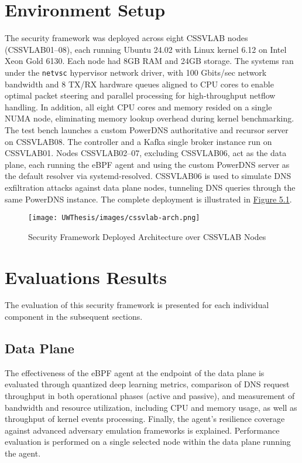 \documentclass [11pt, proquest] {uwthesis}[2020/02/24]
\begin{document}
\section{Environment Setup}
The security framework was deployed across eight CSSVLAB nodes (CSSVLAB{01–08}), each running Ubuntu 24.02 with Linux kernel 6.12 on Intel Xeon Gold 6130. Each node had 8GB RAM and 24GB storage. The systems ran under the \texttt{netvsc} hypervisor network driver, with 100 Gbits/sec network bandwidth and 8 TX/RX hardware queues aligned to CPU cores to enable optimal packet steering and parallel processing for high-throughput netflow handling. In addition, all eight CPU cores and memory resided on a single NUMA node, eliminating memory lookup overhead during kernel benchmarking. The test bench launches a custom PowerDNS authoritative and recursor server on CSSVLAB08. The controller and a Kafka single broker instance run on CSSVLAB01. Nodes CSSVLAB{02–07}, excluding CSSVLAB06, act as the data plane, each running the eBPF agent and using the custom PowerDNS server as the default resolver via systemd-resolved. CSSVLAB06 is used to simulate DNS exfiltration attacks against data plane nodes, tunneling DNS queries through the same PowerDNS instance. The complete deployment is illustrated in \hyperref[sec:deployed-arch]{Figure 5.1}.


\begin{figure}[h]
\centering
\texttt{[image: UWThesis/images/cssvlab-arch.png]}
\caption{Security Framework Deployed Architecture over CSSVLAB Nodes}
\label{sec:deployed-arch}
\end{figure}

\section{Evaluations Results}
The evaluation of this security framework is presented for each individual component in the subsequent sections.

\subsection{Data Plane}
The effectiveness of the eBPF agent at the endpoint of the data plane is evaluated through quantized deep learning metrics, comparison of DNS request throughput in both operational phases (active and passive), and measurement of bandwidth and resource utilization, including CPU and memory usage, as well as throughput of kernel events processing. Finally, the agent’s resilience coverage against advanced adversary emulation frameworks is explained. Performance evaluation is performed on a single selected node within the data plane running the agent.
\end{document}
